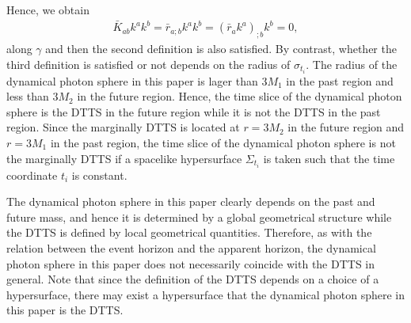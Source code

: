 \documentclass[prd,showpacs,preprintnumbers,groupedaddress,superscriptaddress,nofootinbib,11pt]{revtex4-1} %
\theoremstyle{newplain}
\begin{document}
Hence, we obtain 
\begin{align}
    \bar{K}_{a b} k^{a} k^{b}=\bar{r}_{a; b} k^{a} k^{b}=(\bar{r}_{a} k^{a})_{;b}k^{b}=0,
\end{align}
along $\gamma$ and then the second definition is also satisfied.
By contrast, whether the third definition is satisfied or not depends on the radius of $\sigma_{t_i}$.
The radius of the dynamical photon sphere in this paper is lager than $3M_1$ in the past region and less than $3M_2$ in the future region.
Hence, the time slice of the dynamical photon sphere is the DTTS in the future region while it is not the DTTS in the past region. 
Since the marginally DTTS is located at $r=3M_2$ in the future region and $r=3M_1$ in the past region, the time slice of the dynamical photon sphere is not the marginally DTTS if a spacelike hypersurface $\Sigma_{t_i}$ is taken such that the time coordinate $t_i$ is constant.

The dynamical photon sphere in this paper clearly depends on the past and future mass, and hence it is determined by a global geometrical structure while the DTTS is defined by local geometrical quantities.
Therefore, as with the relation between the event horizon and the apparent horizon, the dynamical photon sphere in this paper does not necessarily coincide with the DTTS in general.
Note that since the definition of the DTTS depends on a choice of a hypersurface,
there may exist a hypersurface that the dynamical photon sphere in this paper is the DTTS.

\afterpage{\clearpage}
\newpage

\end{document}
